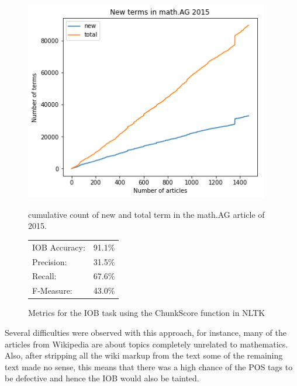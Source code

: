 \documentclass[a4paper]{easychair}
\begin{document}
\begin{figure}
    \centering
    \begin{minipage}{0.55\textwidth}
        \centering
    \includegraphics[width=0.95\textwidth]{cum_terms.png} 
        \caption{\label{cumterms}cumulative count of new and total term in the math.AG article of 2015.}
    \end{minipage}\hfill
    \begin{minipage}{0.4\textwidth}
        \centering
        {\small
        \begin{tabular}{lr}
    IOB Accuracy:  &91.1\%\\
    Precision:     &31.5\%\\
    Recall:        &67.6\%\\
    F-Measure:     &43.0\%
        \end{tabular}}
        \caption{\label{iobstats} Metrics for the IOB task using the ChunkScore function in NLTK}
    \end{minipage}
\end{figure}


Several difficulties were observed with this approach,  for instance, many of the articles from Wikipedia are about topics completely unrelated to mathematics. Also, after stripping all the wiki markup from the text some of the remaining text made no sense, this means that there was a high chance of the POS tags to be defective and hence the IOB would also be tainted. 
\end{document}
